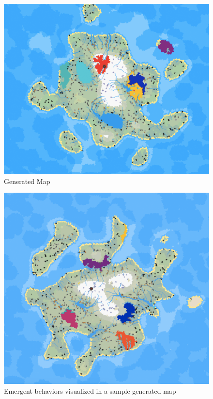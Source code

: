 \begin{figure}
\includegraphics[width=\textwidth]{Sample2.png}
\caption{Generated Map}
\end{figure}

\begin{figure}
\includegraphics[width=\textwidth]{Emergent.png}
\caption{Emergent behaviors visualized in a sample generated map}
\end{figure}

